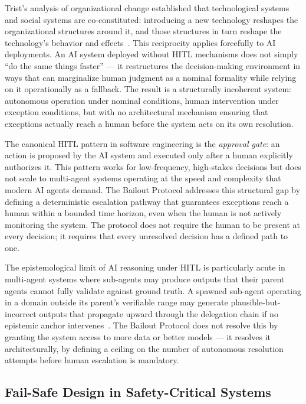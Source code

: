 Trist's analysis of organizational change established that technological systems and social systems are co-constituted: introducing a new technology reshapes the organizational structures around it, and those structures in turn reshape the technology's behavior and effects~\cite{tristr81}. This reciprocity applies forcefully to AI deployments. An AI system deployed without HITL mechanisms does not simply ``do the same things faster'' --- it restructures the decision-making environment in ways that can marginalize human judgment as a nominal formality while relying on it operationally as a fallback. The result is a structurally incoherent system: autonomous operation under nominal conditions, human intervention under exception conditions, but with no architectural mechanism ensuring that exceptions actually reach a human before the system acts on its own resolution.

The canonical HITL pattern in software engineering is the \textit{approval gate}: an action is proposed by the AI system and executed only after a human explicitly authorizes it. This pattern works for low-frequency, high-stakes decisions but does not scale to multi-agent systems operating at the speed and complexity that modern AI agents demand. The Bailout Protocol addresses this structural gap by defining a deterministic escalation pathway that guarantees exceptions reach a human within a bounded time horizon, even when the human is not actively monitoring the system. The protocol does not require the human to be present at every decision; it requires that every unresolved decision has a defined path to one.

The epistemological limit of AI reasoning under HITL is particularly acute in multi-agent systems where sub-agents may produce outputs that their parent agents cannot fully validate against ground truth. A spawned sub-agent operating in a domain outside its parent's verifiable range may generate plausible-but-incorrect outputs that propagate upward through the delegation chain if no epistemic anchor intervenes~\cite{tristr81}. The Bailout Protocol does not resolve this by granting the system access to more data or better models --- it resolves it architecturally, by defining a ceiling on the number of autonomous resolution attempts before human escalation is mandatory.

\subsection{Fail-Safe Design in Safety-Critical Systems}
\label{sec:failsafe}


